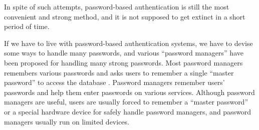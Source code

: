 \documentclass{sigchi}
\begin{document}
In spite of such attempts,
password-based authentication is still the most
convenient and strong method\cite{Bonnearu:ReplacePasswords},
and it is not supposed to get extinct
in a short period of time\cite{Herley:2009:PSS:1601990.1602010}.



If we have to live with password-based authentication systems,
we have to devise some ways to handle many passwords, and
various ``password managers'' have been proposed
for handling many strong passwords.
%
%
Most password managers remembers various passwords and
asks users to remember a single ``master password'' to access the database
\cite{OnePassword}%
\cite{Dashlane}%
\cite{ミルパス}%
\cite{LastPass}%
\cite{KeyPass}%
\cite{NortonIDSafe}%
\cite{IDManager}.
%
%
Password managers remember users' passwords and help them enter
passwords on various services.
Although password managers are useful,
users are usually forced to remember a ``master password''
or a special hardware device
for safely handle password managers, and
password managers usually run on limited devices.

%
\end{document}
